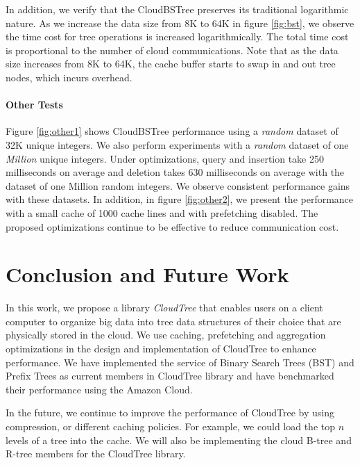 \documentclass[10pt, conference, compsocconf]{IEEEtran}
\begin{document}
 In addition, we verify that the CloudBSTree preserves its traditional logarithmic nature.
As we increase the data size from 8K to 64K in figure \ref{fig:bst}, we observe the time cost for 
 tree operations is increased logarithmically. The total time cost is proportional to the 
 number of cloud communications. 
 Note that as the data size increases from 8K to 64K, the cache buffer starts to swap in and out 
 tree nodes, which incurs overhead.

\paragraph{Other Tests}
Figure \ref{fig:other1} shows CloudBSTree performance using a \emph{random} dataset of 32K unique integers.
We also perform experiments with a \emph{random} dataset of one \emph{Million} unique integers. 
Under optimizations, query and insertion take 250 milliseconds on average and deletion takes
 630 milliseconds on average with the dataset of one Million random integers.
 We observe consistent performance gains with these datasets.
 In addition, in figure \ref{fig:other2}, we present the performance with a small cache of 1000 cache lines and with
  prefetching disabled. The proposed optimizations continue to be effective to reduce communication cost.
  
  




 



\section{Conclusion and Future Work}
In this work, we propose a library \emph{CloudTree} that enables users on a client computer to organize big data into tree data
 structures of their choice that are physically stored in the cloud.
We use caching, prefetching and aggregation optimizations in the
  design and implementation of CloudTree to enhance performance.
  We have implemented the service of Binary Search Trees (BST) and
  Prefix Trees as current members in CloudTree library and have benchmarked
  their performance using the Amazon Cloud.
  
  In the future, we continue to improve the performance of CloudTree by using compression, 
  or different caching policies. For example, 
  we could load the top $n$ levels of a tree into the cache. 
  We will also be implementing the cloud B-tree and R-tree members for the CloudTree library.



















\end{document}

